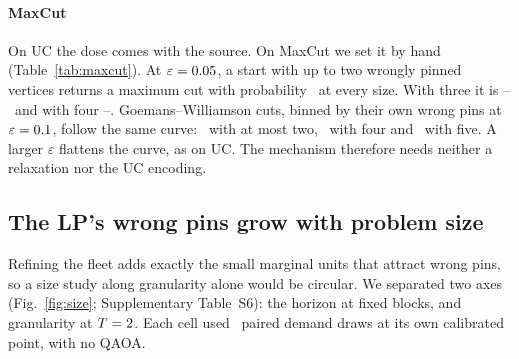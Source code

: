 \paragraph{MaxCut} On UC the dose comes with the source. On MaxCut we set it by hand (Table~\ref{tab:maxcut}). At $\varepsilon=\MCDoseEps$, a start with up to two wrongly pinned vertices returns a maximum cut with probability \MCDoseTwoMin\ at every size. With three it is \MCDoseThreeMin--\MCDoseThreeMax\ and with four \MCDoseFourMin--\MCDoseFourMax. Goemans--Williamson cuts, binned by their own wrong pins at $\varepsilon=\EpsMain$, follow the same curve: \MCGWPinsLow\ with at most two, \MCGWPinsFour\ with four and \MCGWPinsFive\ with five. A larger $\varepsilon$ flattens the curve, as on UC. The mechanism therefore needs neither a relaxation nor the UC encoding.

\begin{table}[t]
\centering
\caption{Dose--response on UC: $P_{\KMax}$ by the number of bits the LP pins wrongly ($p=1$, $\varepsilon=\EpsMain$). Inst.: scenarios (L2) or structures (L4) in the bin; 95\% $t$-interval of the paired difference.}
\label{tab:dose}
\scriptsize
\setlength{\tabcolsep}{2.5pt}

\end{table}

\begin{table}[t]
\centering
\caption{3-regular MaxCut, $p=1$, \MCGraphs\ graphs per size. Cold: $P_{\KMax}$ of the cold start. Columns 3--5: $P_{\KMax}$ of the badly pinned starts by wrong pins ($\varepsilon=\MCDoseEps$). Columns 6--8: $R^2$ of the logistic fit of $P_{\KMax}$ on overlap, on overlap and band mass, and of the UC curve applied unchanged. Last two: graphs on which the rule picks the best source ($\varepsilon=\EpsMain$; graphs where all sources tie are left out).}
\label{tab:maxcut}
\scriptsize
\setlength{\tabcolsep}{2.5pt}

\end{table}

\subsection{The LP's wrong pins grow with problem size}
\label{sec:res-size}

Refining the fleet adds exactly the small marginal units that attract wrong pins, so a size study along granularity alone would be circular. We separated two axes (Fig.~\ref{fig:size}; Supplementary Table~S6): the horizon at fixed blocks, and granularity at $T=2$. Each cell used \NCensus\ paired demand draws at its own calibrated point, with no QAOA.

